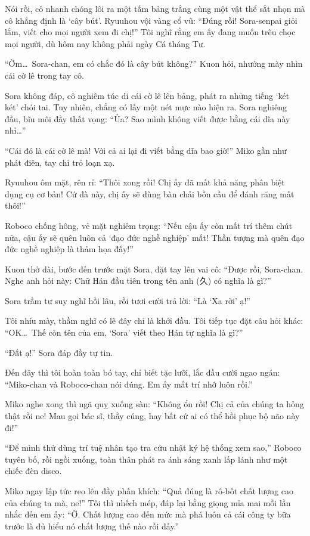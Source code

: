 \documentclass[../main.tex]{subfiles}
\begin{document}
Nói rồi, cô nhanh chóng lôi ra một tấm bảng trắng cùng một vật thể sắt nhọn mà cô khẳng định là `cây bút'. Ryuuhou vội vàng cổ vũ: ``Đúng rồi! Sora-senpai giỏi lắm, viết cho mọi người xem đi chị!'' Tôi nghĩ rằng em ấy đang muốn trêu chọc mọi người, dù hôm nay không phải ngày Cá tháng Tư.


``Ờm\dots\ Sora-chan, em có chắc đó là cây bút không?'' Kuon hỏi, nhướng mày nhìn cái cờ lê trong tay cô.

Sora không đáp, cô nghiêm túc di cái cờ lê lên bảng, phát ra những tiếng `két két' chói tai. Tuy nhiên, chẳng có lấy một nét mực nào hiện ra. Sora nghiêng đầu, bĩu môi đầy thất vọng: ``Ủa? Sao mình không viết được bằng cái dĩa này nhỉ\dots''

``Cái đó là cái cờ lê mà! Với cả ai lại đi viết bằng dĩa bao giờ!'' Miko gần như phát điên, tay chỉ trỏ loạn xạ.

Ryuuhou ôm mặt, rên rỉ: ``Thôi xong rồi! Chị ấy đã mất khả năng phân biệt dụng cụ cơ bản! Cứ đà này, chị ấy sẽ dùng bàn chải bồn cầu để đánh răng mất thôi!''

Roboco chống hông, vẻ mặt nghiêm trọng: ``Nếu cậu ấy còn mất trí thêm chút nữa, cậu ấy sẽ quên luôn cả `đạo đức nghề nghiệp' mất! Thần tượng mà quên đạo đức nghề nghiệp là thảm họa đấy!''

Kuon thở dài, bước đến trước mặt Sora, đặt tay lên vai cô: ``Được rồi, Sora-chan. Nghe anh hỏi này: Chữ Hán đầu tiên trong tên anh (久) có nghĩa là gì?''

Sora trầm tư suy nghĩ hồi lâu, rồi tươi cười trả lời: ``Là `Xa rời' ạ!''

Tôi nhíu mày, thầm nghĩ có lẽ đây chỉ là khởi đầu. Tôi tiếp tục đặt câu hỏi khác: ``OK\dots\ Thế còn tên của em, `Sora' viết theo Hán tự nghĩa là gì?''

``Đất ạ!'' Sora đáp đầy tự tin.

Đến đây thì tôi hoàn toàn bó tay, chỉ biết tặc lưỡi, lắc đầu cười ngao ngán: ``Miko-chan và Roboco-chan nói đúng. Em ấy mất trí nhớ luôn rồi.''

Miko nghe xong thì ngã quỵ xuống sàn: ``Không ổn rồi! Chị cả của chúng ta hỏng thật rồi ne! Mau gọi bác sĩ, thầy cúng, hay bất cứ ai có thể hồi phục bộ não này đi!''

``Để mình thử dùng trí tuệ nhân tạo tra cứu nhật ký hệ thống xem sao,'' Roboco tuyên bố, rồi ngồi xuống, toàn thân phát ra ánh sáng xanh lấp lánh như một chiếc đèn disco.

Miko ngay lập tức reo lên đầy phấn khích: ``Quả đúng là rô-bốt chất lượng cao của chúng ta mà, ne!'' Tôi thì nhếch mép, đáp lại bằng giọng mỉa mai mỗi lần nhắc đến em ấy: ``Ờ. Chất lượng cao đến mức mà phá luôn cả cái công ty bữa trước là đủ hiểu nó chất lượng thế nào rồi đấy.''
\end{document}
